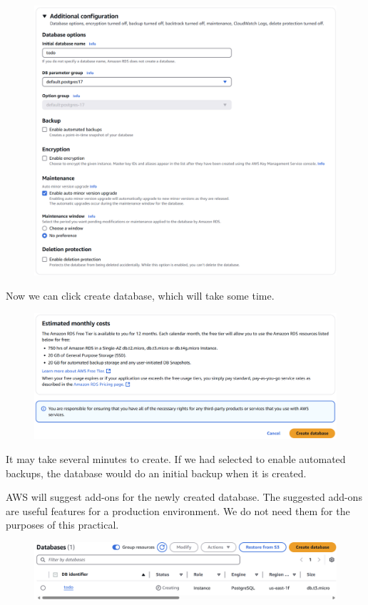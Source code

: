 \documentclass{csse4400}
\begin{document}
\begin{figure}[H]
  \includegraphics[width=\textwidth]{images/db7}
\end{figure}

\noindent
Now we can click create database, which will take some time.

\begin{figure}[H]
  \includegraphics[width=\textwidth]{images/db8}
\end{figure}

\noindent
It may take several minutes to create.
If we had selected to enable automated backups, the database would do an initial backup when it is created.

AWS will suggest add-ons for the newly created database.
The suggested add-ons are useful features for a production environment.
We do not need them for the purposes of this practical.

\begin{figure}[H]
  \includegraphics[width=\textwidth]{images/aws_4}
\end{figure}
\end{document}
